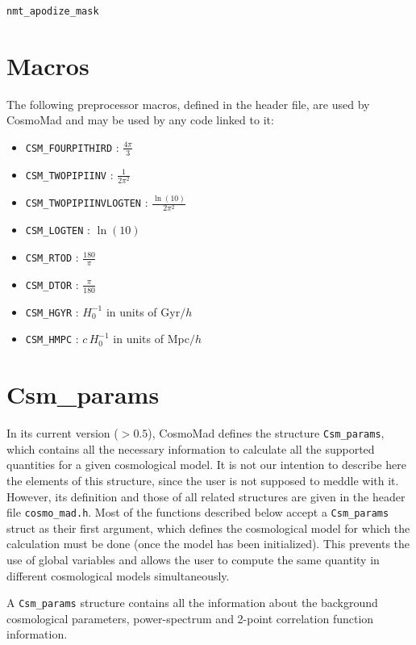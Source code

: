 \documentclass[a4paper,10pt]{article}
\newcommand{\macr}[1]{{\tt \textcolor{BrickRed}{#1}}}
\begin{document}
{\tt nmt\_apodize\_mask}

\section{Macros}

The following preprocessor macros, defined in the header file, are used
by CosmoMad and may be used by any code linked to it:
\begin{itemize}
 \item \macr{CSM\_FOURPITHIRD} : $\frac{4\pi}{3}$
 \item \macr{CSM\_TWOPIPIINV} : $\frac{1}{2\pi^2}$
 \item \macr{CSM\_TWOPIPIINVLOGTEN} : $\frac{\ln(10)}{2\pi^2}$
 \item \macr{CSM\_LOGTEN} : $\ln(10)$
 \item \macr{CSM\_RTOD} : $\frac{180}{\pi}$
 \item \macr{CSM\_DTOR} : $\frac{\pi}{180}$
 \item \macr{CSM\_HGYR} : $H_0^{-1}$ in units of Gyr$/h$
 \item \macr{CSM\_HMPC} : $c\,H_0^{-1}$ in units of Mpc$/h$
\end{itemize}

\section{Csm\_params}

In its current version ($>0.5$), CosmoMad defines the structure
{\tt Csm\_params}, which contains all the necessary information to
calculate all the supported quantities for a given cosmological 
model. It is not our intention to describe here the elements of
this structure, since the user is not supposed to meddle with it.
However, its definition and those of all related structures are
given in the header file {\tt cosmo\_mad.h}. Most of the functions
described below accept a {\tt Csm\_params} struct as their first
argument, which defines the cosmological model for which the 
calculation must be done (once the model has been initialized).
This prevents the use of global variables and allows the user to
compute the same quantity in different cosmological models
simultaneously.

A {\tt Csm\_params} structure contains all the information about
the background cosmological parameters, power-spectrum and 2-point
correlation function information.
\end{document}
